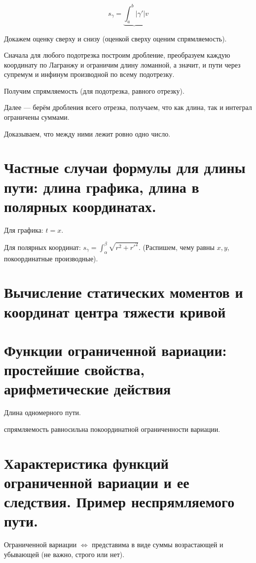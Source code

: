 \documentclass[12pt, a4paper]{article}
\begin{document}
    \begin{equation}
        s_\gamma = \underbrace{\int^b_a |\gamma'|}{v}
    \end{equation}

    Докажем оценку сверху и снизу (оценкой сверху оценим спрямляемость).

    Сначала для любого подотрезка построим дробление, 
    преобразуем каждую координату по Лагранжу и ограничим 
    длину ломанной, а значит, и пути через супремум и инфинум производной по всему подотрезку.

    Получим спрямляемость (для подотрезка, равного отрезку).

    \splitdoc

    Далее — берём дробления всего отрезка, получаем, что как длина, так и интеграл ограничены суммами.

    Доказываем, что между ними лежит ровно одно число.


\section{Частные случаи формулы для длины пути: длина графика, длина в полярных координатах.}

    Для графика: $t = x$.

    Для полярных координат: $s_\gamma = \int^\beta_\alpha \sqrt{r^2 + r'^2}$.
    (Распишем, чему равны $x, y$, покоординатные производные).



\section{Вычисление статических моментов и координат центра тяжести кривой}
\section{Функции ограниченной вариации: простейшие свойства, арифметические действия}

    Длина одномерного пути.

    спрямляемость равносильна покоординатной ограниченности вариации.

\section{Характеристика функций ограниченной вариации и ее следствия. Пример неспрямляемого пути.}

    Ограниченной вариации $\Leftrightarrow$ представима в виде суммы возрастающей и убывающей (не важно, строго или нет).
\end{document}
